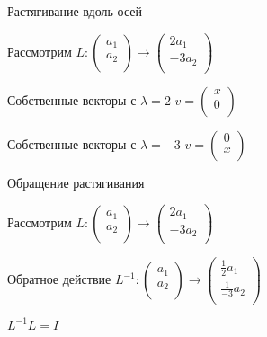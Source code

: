 \documentclass[14pt,xcolor=dvipsnames]{beamer}
\begin{document}
\begin{frame}{Растягивание вдоль осей}

Рассмотрим $L : \begin{pmatrix}
  a_1 \\
  a_2 \\
\end{pmatrix} \to
\begin{pmatrix}
  2a_1 \\
  -3a_2 \\
\end{pmatrix}
$

\begin{block}{Собственные векторы с $\lambda = 2$}
  $v=\begin{pmatrix}
    x \\
    0 \\
  \end{pmatrix}$
\end{block}


\begin{block}{Собственные векторы с $\lambda = -3$}
  $v=\begin{pmatrix}
    0 \\
    x \\
  \end{pmatrix}$
\end{block}


\end{frame}


\begin{frame}{Обращение растягивания}

Рассмотрим $L : \begin{pmatrix}
  a_1 \\
  a_2 \\
\end{pmatrix} \to
\begin{pmatrix}
  2a_1 \\
  -3a_2 \\
\end{pmatrix}
$
  
\begin{block}{Обратное действие}
  $L^{-1} : \begin{pmatrix}
    a_1 \\
    a_2 \\
  \end{pmatrix} \to
  \begin{pmatrix}
    \frac{1}{2}a_1 \\
    \frac{1}{-3}a_2 \\
  \end{pmatrix}
  $
\end{block}

\begin{block}{$L^{-1}L = I$}  
\end{block}

\end{frame}
\end{document}
